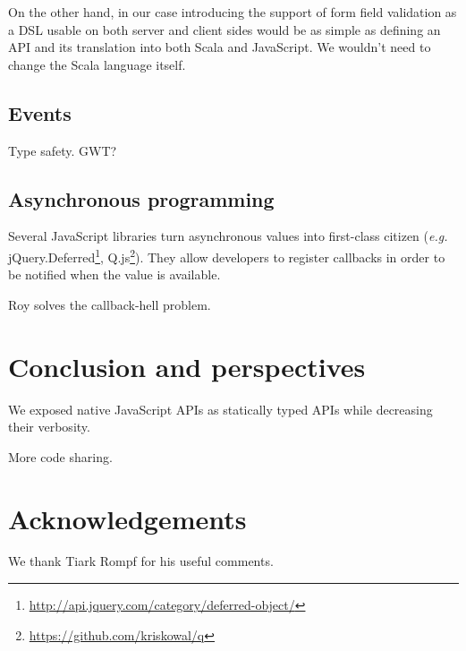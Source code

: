 \documentclass[american,english,runningheads]{llncs}
\newcommand{\eg}{\emph{e.g.}}
\begin{document}
On the other hand, in our case introducing the support of form field validation as a DSL usable on both server and client sides would be as simple as defining an API and its translation into both Scala and JavaScript. We wouldn’t need to change the Scala language itself.

\subsection{Events}

Type safety. GWT?

\subsection{Asynchronous programming}

Several JavaScript libraries turn asynchronous values into first-class citizen (\eg{} jQuery.Deferred\footnote{\href{http://api.jquery.com/category/deferred-object/}{http://api.jquery.com/category/deferred-object/}}, Q.js\footnote{\href{https://github.com/kriskowal/q}{https://github.com/kriskowal/q}}). They allow developers to register callbacks in order to be notified when the value is available.

Roy solves the callback-hell problem.

\section{Conclusion and perspectives}
\label{discussion}

We exposed native JavaScript APIs as statically typed APIs while decreasing their verbosity.

More code sharing.

\section{Acknowledgements}

We thank Tiark Rompf for his useful comments.



\end{document}
